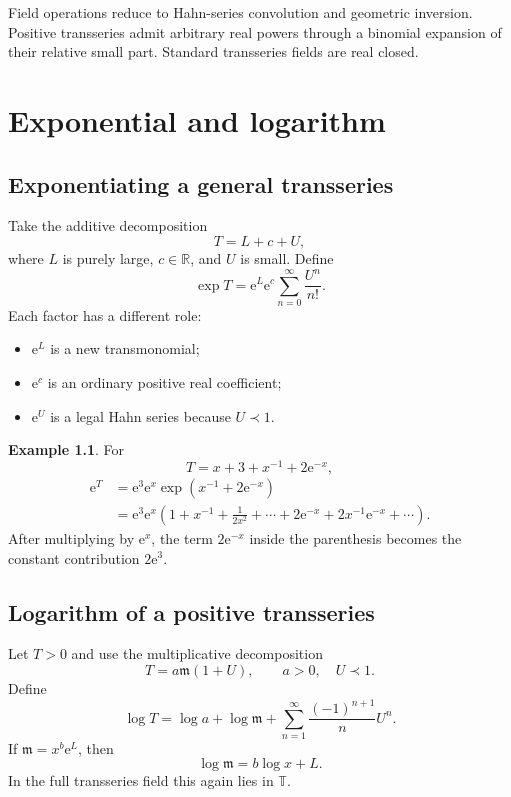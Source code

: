 \documentclass[11pt,oneside]{book}
\theoremstyle{definition}
\newtheorem{example}[theorem]{Example}
\theoremstyle{remark}
\newcommand{\R}{\mathbb{R}}
\newcommand{\T}{\mathbb{T}}
\newcommand{\m}{\mathfrak{m}}
\newcommand{\e}{\mathrm{e}}
\newcommand{\precdom}{\prec}
\begin{document}
\begin{summarybox}
Field operations reduce to Hahn-series convolution and geometric inversion.
Positive transseries admit arbitrary real powers through a binomial expansion of
their relative small part. Standard transseries fields are real closed.
\end{summarybox}

\chapter{Exponential and logarithm}
\label{ch:exp-log}

\section{Exponentiating a general transseries}

Take the additive decomposition
\[
  T=L+c+U,
\]
where $L$ is purely large, $c\in\R$, and $U$ is small. Define
\begin{equation}
  \exp T=\e^L\e^c
  \sum_{n=0}^{\infty}\frac{U^n}{n!}.
  \label{eq:exp-definition}
\end{equation}
Each factor has a different role:
\begin{itemize}
\item $\e^L$ is a new transmonomial;
\item $\e^c$ is an ordinary positive real coefficient;
\item $\e^U$ is a legal Hahn series because $U\precdom1$.
\end{itemize}

\begin{example}
For
\[
 T=x+3+x^{-1}+2\e^{-x},
\]
\begin{align*}
 \e^T
 &=\e^3\e^x
   \exp(x^{-1}+2\e^{-x})\\
 &=\e^3\e^x\left(
   1+x^{-1}+\frac{1}{2x^2}+\cdots
   +2\e^{-x}+2x^{-1}\e^{-x}+\cdots
   \right).
\end{align*}
After multiplying by $\e^x$, the term $2\e^{-x}$ inside the parenthesis becomes
the constant contribution $2\e^3$.
\end{example}

\section{Logarithm of a positive transseries}

Let $T>0$ and use the multiplicative decomposition
\[
  T=a\m(1+U),\qquad a>0,\quad U\precdom1.
\]
Define
\begin{equation}
  \log T=\log a+\log\m+
  \sum_{n=1}^{\infty}\frac{(-1)^{n+1}}{n}U^n.
  \label{eq:log-definition}
\end{equation}
If $\m=x^b\e^L$, then
\[
  \log\m=b\log x+L.
\]
In the full transseries field this again lies in $\T$.
\end{document}
